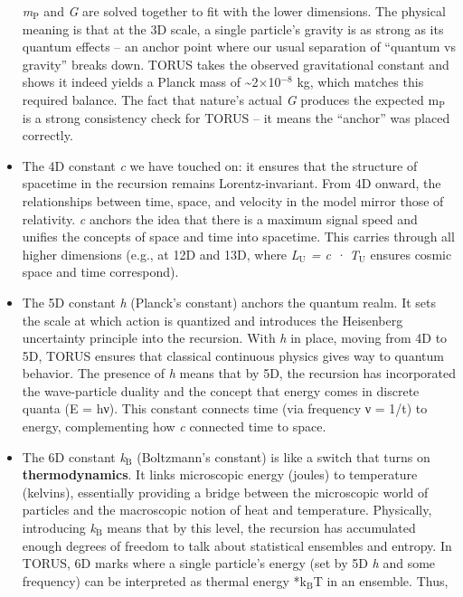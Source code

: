 \documentclass[]{article}
\newcommand{\subscript}[1]{\ensuremath{_{\mathrm{#1}}}}
\newcommand{\superscript}[1]{\ensuremath{^{\mathrm{#1}}}}
\begin{document}
\begin{itemize}
  \emph{m\subscript{P}} and
  \emph{G} are solved together to fit with the lower dimensions. The
  physical meaning is that at the 3D scale, a single particle's gravity
  is as strong as its quantum effects -- an anchor point where our usual
  separation of ``quantum vs gravity'' breaks down. TORUS takes the
  observed gravitational constant and shows it indeed yields a Planck
  mass of \textasciitilde{}2×10\superscript{−8} kg, which matches this required
  balance. The fact that nature's actual \emph{G} produces the expected
  m\subscript{P} is a
  strong consistency check for TORUS​ -- it means the ``anchor'' was
  placed correctly.
\item
  The 4D constant \emph{c} we have touched on: it ensures that the
  structure of spacetime in the recursion remains Lorentz-invariant.
  From 4D onward, the relationships between time, space, and velocity in
  the model mirror those of relativity. \emph{c} anchors the idea that
  there is a maximum signal speed and unifies the concepts of space and
  time into spacetime. This carries through all higher dimensions (e.g.,
  at 12D and 13D, where
  \emph{L\subscript{U} = c
  · T\subscript{U}} ensures
  cosmic space and time correspond​).
\item
  The 5D constant \emph{h} (Planck's constant) anchors the quantum
  realm. It sets the scale at which action is quantized and introduces
  the Heisenberg uncertainty principle into the recursion. With \emph{h}
  in place, moving from 4D to 5D, TORUS ensures that classical
  continuous physics gives way to quantum behavior. The presence of
  \emph{h} means that by 5D, the recursion has incorporated the
  wave-particle duality and the concept that energy comes in discrete
  quanta (E = hν). This constant connects time (via frequency ν = 1/t)
  to energy, complementing how \emph{c} connected time to space.
\item
  The 6D constant
  \emph{k\subscript{B}}
  (Boltzmann's constant) is like a switch that turns on
  \textbf{thermodynamics}. It links microscopic energy (joules) to
  temperature (kelvins), essentially providing a bridge between the
  microscopic world of particles and the macroscopic notion of heat and
  temperature. Physically, introducing
  \emph{k\subscript{B}}
  means that by this level, the recursion has accumulated enough degrees
  of freedom to talk about statistical ensembles and entropy. In TORUS,
  6D marks where a single particle's energy (set by 5D \emph{h} and some
  frequency) can be interpreted as thermal energy
  *k\subscript{B}T in an
  ensemble. Thus,

\end{itemize}
\end{document}
